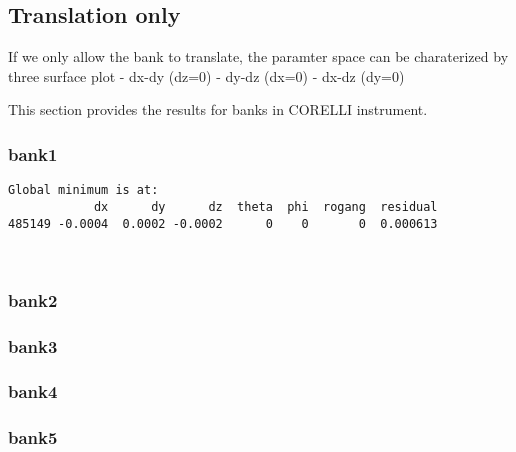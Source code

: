 \documentclass[11pt]{article}
\begin{document}
    \hypertarget{translation-only}{%
\subsection{Translation only}\label{translation-only}}

If we only allow the bank to translate, the paramter space can be
charaterized by three surface plot - dx-dy (dz=0) - dy-dz (dx=0) - dx-dz
(dy=0)

This section provides the results for banks in CORELLI instrument.

    \hypertarget{bank1}{%
\subsubsection{bank1}\label{bank1}}

    \begin{Verbatim}[commandchars=\\\{\}]
Global minimum is at:
            dx      dy      dz  theta  phi  rogang  residual
485149 -0.0004  0.0002 -0.0002      0    0       0  0.000613
    \end{Verbatim}

    \begin{center}
    \end{center}
    { \hspace*{\fill} \\}
    
    \hypertarget{bank2}{%
\subsubsection{bank2}\label{bank2}}

    \hypertarget{bank3}{%
\subsubsection{bank3}\label{bank3}}

    \hypertarget{bank4}{%
\subsubsection{bank4}\label{bank4}}

    \hypertarget{bank5}{%
\subsubsection{bank5}\label{bank5}}
\end{document}
